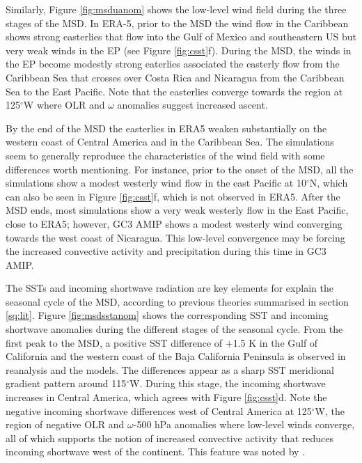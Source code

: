 Similarly, Figure \ref{fig:msduanom} shows the low-level wind field during the three stages of the MSD. In ERA-5, prior to the MSD the wind flow in the Caribbean shows strong easterlies that flow into the Gulf of Mexico and southeastern US but very weak winds in the EP (see Figure \ref{fig:csst}f). During the MSD, the winds in the EP become modestly strong eaterlies associated the easterly flow from the Caribbean Sea that crosses over Costa Rica and Nicaragua from the Caribbean Sea to the East Pacific. Note that the easterlies converge towards the region at 125$^\circ$W where OLR and $\omega$ anomalies suggest increased ascent. 

By the end of the MSD the easterlies in ERA5 weaken substantially on the western coast of Central America and in the Caribbean Sea.
The simulations seem to generally reproduce the characteristics of the wind field with some differences worth mentioning. For instance, prior to the onset of the MSD, all the simulations show a modest westerly wind flow in the east Pacific at 10$^\circ$N, which can also be seen in Figure \ref{fig:csst}f, which is not observed in ERA5.
After the MSD ends, most simulations show a very weak westerly flow in the East Pacific, close to ERA5; however, GC3 AMIP shows a modest westerly wind converging towards the west coast of Nicaragua. This low-level convergence may be forcing the increased convective activity and precipitation during this time in GC3 AMIP.

The SSTs and incoming shortwave radiation are key elements for explain the seasonal cycle of the MSD, according to previous theories summarised in section \ref{sq:lit}. 
Figure \ref{fig:msdsstanom} shows the corresponding SST and incoming shortwave anomalies during the different stages of the seasonal cycle. %
From the first peak to the MSD, a positive SST difference of +1.5 K in the Gulf of California and the western coast of the Baja California Peninsula is observed in reanalysis and the models. The differences appear as a sharp SST meridional gradient pattern around 115$^\circ$W. 
During this stage, the incoming shortwave increases in Central America, which agrees with Figure \ref{fig:csst}d. 
Note the negative incoming shortwave differences west of Central America at 125$^\circ$W, the region of negative OLR and $\omega$-500 hPa anomalies where low-level winds converge, all of which supports the notion of increased convective activity that reduces incoming shortwave west of the continent. This feature was noted by \cite{herrera2015}. 

